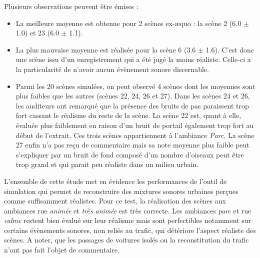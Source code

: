 Plusieurs observations peuvent être émises : 
\begin{itemize}
\item La meilleure moyenne est obtenue pour 2 scènes ex-æquo : la scène 2 (6.0 $\pm$ 1.0) et 23 (6.0 $\pm$ 1.1).
\item La plus mauvaise moyenne est réalisée pour la scène 6 (3.6 $\pm$ 1.6). C'est donc une scène issu d'un enregistrement qui a été jugé la moins réaliste. Celle-ci a la particularité de n'avoir aucun évènement sonore discernable. 
\item Parmi les 20 scènes simulées, on peut observé 4 scènes dont les moyennes sont plus faibles que les autres (scènes 22, 24, 26 et 27). Dans les scènes 24 et 26, les auditeurs ont remarqué que la présence des bruits de pas paraissent trop fort cassant le réalisme du reste de la scène. La scène 22 est, quant à elle, évaluée plus faiblement en raison d'un bruit de portail également trop fort au début de l'extrait. Ces trois scènes appartiennent à l'ambiance \textit{Parc}. La scène 27 enfin n'a pas reçu de commentaire mais sa note moyenne plus faible peut s'expliquer par un bruit de fond composé d'un nombre d'oiseaux peut être trop grand et qui parait peu réaliste dans un milieu urbain.\\
\end{itemize}

L'ensemble de cette étude met en évidence les performances de l'outil de simulation qui permet de reconstruire des mixtures sonores urbaines perçues comme suffisamment réalistes. Pour ce test, la réalisation des scènes aux ambiances rue \textit{animée} et \textit{très animée} est très correcte. Les ambiances \textit{parc} et rue \textit{calme} restent bien évalué sur leur réalisme mais sont perfectibles notamment sur certains évènements sonores, non reliés au trafic, qui détériore l'aspect réaliste des scènes. A noter, que les passages de voitures isolés ou la reconstitution du trafic n'ont pas fait l'objet de commentaire.

%
%
%
%